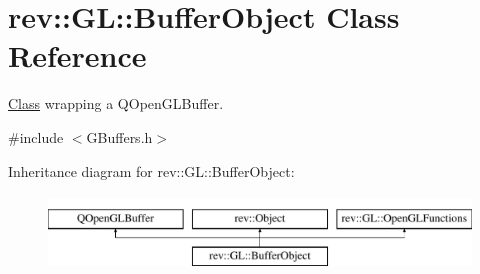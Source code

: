 \hypertarget{classrev_1_1_g_l_1_1_buffer_object}{}\section{rev\+::GL\+::Buffer\+Object Class Reference}
\label{classrev_1_1_g_l_1_1_buffer_object}


\mbox{\hyperlink{struct_class}{Class}} wrapping a Q\+Open\+G\+L\+Buffer.  




{\ttfamily \#include $<$G\+Buffers.\+h$>$}

Inheritance diagram for rev\+::GL\+::Buffer\+Object\+:\begin{figure}[H]
\begin{center}
\leavevmode
\includegraphics[height=2.000000cm]{classrev_1_1_g_l_1_1_buffer_object}
\end{center}
\end{figure}
